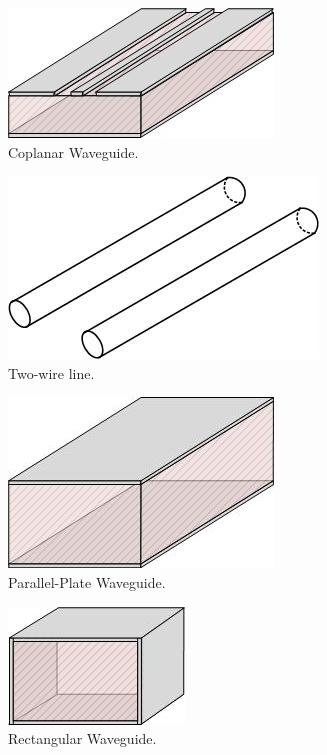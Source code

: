 \documentclass{ximera}
\begin{document}
\begin{figure}[ht!]
\begin{center}
\includegraphics[scale=0.4]{../jpg/cpw.jpg}
\caption{\label{fig:qm/CPW} Coplanar Waveguide.}
\end{center}
\end{figure}

\begin{figure}[ht!]
\begin{center}
\includegraphics[scale=0.4]{../jpg/twowireline.jpg}
\caption{\label{fig:qm/TwoWL} Two-wire line.}
\end{center}
\end{figure}

\begin{figure}[ht!]
\begin{center}
\includegraphics[scale=0.4]{../jpg/ppw.jpg}
\caption{\label{fig:qm/PPW} Parallel-Plate Waveguide.}
\end{center}
\end{figure}

\begin{figure}[ht!]
\begin{center}
\includegraphics[scale=0.4]{../jpg/rectwg.jpg}
\caption{\label{fig:qm/RecWG} Rectangular Waveguide.}
\end{center}
\end{figure}
\end{document}
